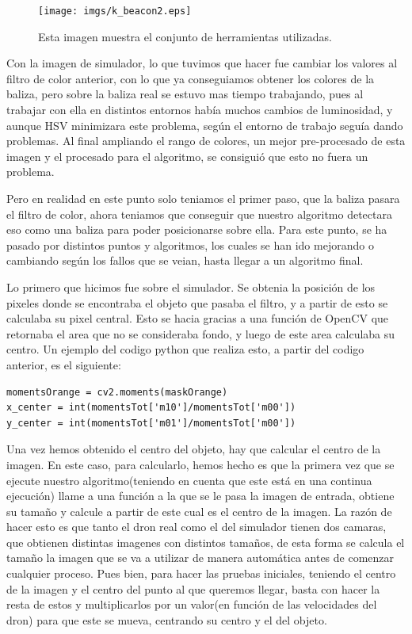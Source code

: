 \begin{figure}[ht]
	\centering
		\texttt{[image: imgs/k\_beacon2.eps]}
		\caption{Esta imagen muestra el conjunto de herramientas utilizadas.}
	\label{fig:Herramientas}
\end{figure}

\hspace{1 cm} Con la imagen de simulador, lo que tuvimos que hacer fue cambiar los valores al filtro de color anterior, con lo que ya conseguiamos obtener los colores de la baliza, pero sobre la baliza real se estuvo mas tiempo trabajando, pues al trabajar con ella en distintos entornos hab\'ia muchos cambios de luminosidad, y aunque HSV minimizara este problema, seg\'un el entorno de trabajo segu\'ia dando problemas. Al final ampliando el rango de colores, un mejor pre-procesado de esta imagen y el procesado para el algoritmo, se consigui\'o que esto no fuera un problema. 

\hspace{1 cm} Pero en realidad en este punto solo teniamos el primer paso, que la baliza pasara el filtro de color, ahora teniamos que conseguir que nuestro algoritmo detectara eso como una baliza para poder posicionarse sobre ella. Para este punto, se ha pasado por distintos puntos y algoritmos, los cuales se han ido mejorando o cambiando seg\'un los fallos que se veian, hasta llegar a un algoritmo final.

\hspace{1 cm} Lo primero que hicimos fue sobre el simulador. Se obtenia la posici\'on de los pixeles donde se encontraba el objeto que pasaba el filtro, y a partir de esto se calculaba su pixel central. Esto se hacia gracias a una funci\'on de OpenCV que retornaba el area que no se consideraba fondo, y luego de este area calculaba su centro. Un ejemplo del codigo python que realiza esto, a partir del codigo anterior, es el siguiente:

\begin{verbatim}
momentsOrange = cv2.moments(maskOrange)
x_center = int(momentsTot['m10']/momentsTot['m00'])
y_center = int(momentsTot['m01']/momentsTot['m00'])
\end{verbatim}

\hspace{1cm} Una vez hemos obtenido el centro del objeto, hay que calcular el centro de la imagen. En este caso, para calcularlo, hemos hecho es que la primera vez que se ejecute nuestro algoritmo(teniendo en cuenta que este est\'a en una continua ejecuci\'on) llame a una funci\'on a la que se le pasa la imagen de entrada, obtiene su tamaño y calcule a partir de este cual es el centro de la imagen. La raz\'on de hacer esto es que tanto el dron real como el del simulador tienen dos camaras, que obtienen distintas imagenes con distintos tamaños, de esta forma se calcula el tamaño la imagen que se va a utilizar de manera autom\'atica antes de comenzar cualquier proceso. Pues bien, para hacer las pruebas iniciales, teniendo el centro de la imagen y el centro del punto al que queremos llegar, basta con hacer la resta de estos y multiplicarlos por un valor(en funci\'on de las velocidades del dron) para que este se mueva, centrando su centro y el del objeto. 

